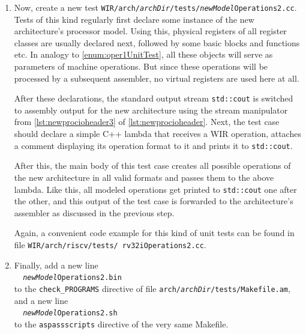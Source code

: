 \begin{enumerate}[resume]
  The most important part, however, is shown in  that needs to be put at the very end of the Makefile.
  These lines create a wrapper script that executes the actual \gls{WIR} test program and forwards its output into a temporary file.
  This temporary file is afterwards fed into the new architecture's assembler (cf. \cref{lst:asmTestMakefile8}) as determined by the \texttt{{\itshape NEWMODEL}AS} macro from the previous step.
  Should the assembler require any specific command-line flags, simply add them to \cref{lst:asmTestMakefile8} immediately before \verb|$$|\texttt{TMPFILE}.
  Note that \cref{lst:asmTestMakefile6} uses regular apostrophe characters \texttt{'} twice, but two reversed apostrophes \`{} (accent grave) in order to surround the \texttt{basename }\verb|$$|\texttt{0} command.

  \item Now, create a new test \texttt{WIR/arch/{\itshape archDir}/tests/{\itshape new\-Model}Operations2.cc}.
  Tests of this kind regularly first declare some instance of the new architecture's processor model.
  Using this, physical registers of all register classes are usually declared next, followed by some basic blocks and functions etc.
  In analogy to \cref{enum:oper1UnitTest}, all these objects will serve as parameters of machine operations.
  But since these operations will be processed by a subsequent assembler, no virtual registers are used here at all.

  After these declarations, the standard output stream \texttt{std::cout} is switched to assembly output for the new architecture using the stream manipulator from \cref{lst:newprocioheader3} of \cref{lst:newprocioheader}.
  Next, the test case should declare a simple C++ lambda that receives a \gls{WIR} operation, attaches a comment displaying its operation format to it and prints it to \texttt{std::cout}.

  After this, the main body of this test case creates all possible operations of the new architecture in all valid formats and passes them to the above lambda.
  Like this, all modeled operations get printed to \texttt{std::cout} one after the other, and this output of the test case is forwarded to the architecture's assembler as discussed in the previous step.

  Again, a convenient code example for this kind of unit tests can be found in file \texttt{WIR/arch/riscv/tests/ rv32iOperations2.cc}.

  \item Finally, add a new line \\
  \verb|  |\texttt{{\itshape newModel}Operations2.bin} \\
  to the \texttt{check\_PROGRAMS} directive of file \texttt{arch/{\itshape archDir}/tests/Makefile.am}, and a new line \\
  \verb|  |\texttt{{\itshape newModel}Operations2.sh} \\
  to the \texttt{aspassscripts} directive of the very same Makefile.
\end{enumerate}


\cleardoubleoddpage
